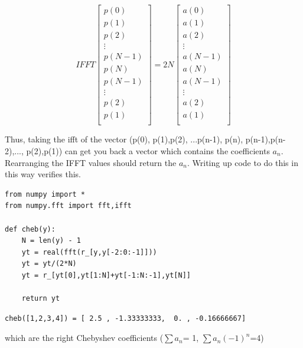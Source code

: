 \documentclass[letterpaper,12pt]{article}
\begin{document}
\begin{enumerate}
  \[IFFT\begin{bmatrix}
           p(0) \\
           p(1) \\
           p(2) \\
           \vdots \\
           p(N-1) \\
           p(N)\\
           p(N-1) \\
           \vdots \\
           p(2) \\
           p(1)\\
         \end{bmatrix}= 2N \begin{bmatrix}
           a(0) \\
           a(1) \\
           a(2) \\
           \vdots \\
           a(N-1) \\
           a(N)\\
           a(N-1) \\
           \vdots \\
           a(2) \\
           a(1)\\
         \end{bmatrix}\]
  
Thus, taking the ifft of the vector (p(0), p(1),p(2), ...p(n-1), p(n), p(n-1),p(n-2),..., p(2),p(1)) can get you back a vector which contains the coefficients $a_n$. Rearranging the IFFT values should return the $a_n$. Writing up code to do this in this way verifies this.

\begin{lstlisting}[style=myPythonstyle]
from numpy import *
from numpy.fft import fft,ifft

def cheb(y):
    N = len(y) - 1
    yt = real(fft(r_[y,y[-2:0:-1]]))
    yt = yt/(2*N)
    yt = r_[yt[0],yt[1:N]+yt[-1:N:-1],yt[N]]

    return yt

\end{lstlisting}

\begin{lstlisting}[style=myPythonstyle]
cheb([1,2,3,4]) = [ 2.5 , -1.33333333,  0. , -0.16666667]

\end{lstlisting}
which are the right Chebyshev coefficients ($\sum a_n $= 1, $\sum a_n (-1)^n$=4)
\end{enumerate}
\end{document}
